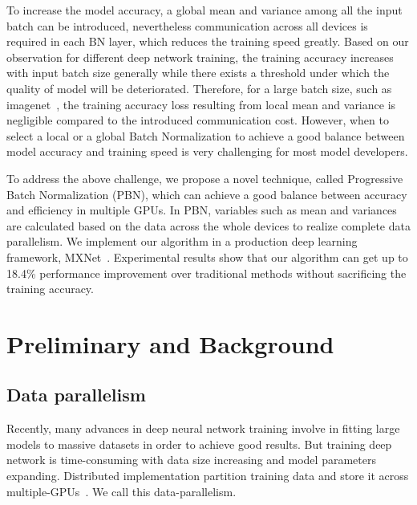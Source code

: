\documentclass{llncs}
\begin{document}

To increase the model accuracy, a global mean and variance among all the input batch can be introduced, nevertheless communication across all devices is required in each BN layer, which reduces the training speed greatly. Based on our observation for different deep network training, the training accuracy increases with input batch size generally while there exists a threshold under which the quality of model will be deteriorated. Therefore, for a large batch size, such as imagenet~\cite{krizhevsky2012imagenet}, the training accuracy loss resulting from local mean and variance is negligible compared to the introduced communication cost. However, when to select a local or a global Batch Normalization to achieve a good balance between model accuracy and training speed is very challenging for most model developers.  

To address the above challenge, we propose a novel technique, called Progressive Batch Normalization (PBN), which can achieve a good balance between accuracy and efficiency in multiple GPUs. In PBN, variables such as mean and variances are calculated based on the data across the whole devices to realize complete data parallelism. We implement our algorithm in a production deep learning framework, MXNet~\cite{chen2015mxnet}. Experimental results show that 
our algorithm can get up to 18.4\% performance improvement over traditional methods without sacrificing the training accuracy. 


\section{Preliminary and Background}

\subsection{Data parallelism}


Recently, many advances in deep neural network training involve in fitting large models to massive datasets in order to achieve good results. But training deep network is time-consuming with data size increasing and model parameters expanding. Distributed implementation partition training data and store it across multiple-GPUs~\cite{data-parallelism}. We call this data-parallelism.   
\end{document}
